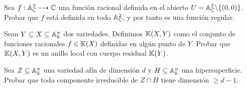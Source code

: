 \documentclass[ACGA.tex]{subfiles}
\begin{document}
\begin{ejer}\label{a2menos0}
 Sea $f:\mathbb{A}^2_{\mathbb{C}}\dashrightarrow\mathbb{C}$ una función racional definida en el abierto $U=\mathbb{A}^2_{\mathbb{C}}\backslash\{(0,0)\}$. Probar que $f$ está definida en todo $\mathbb{A}^2_{\mathbb{C}}$, y por tanto es una función regular.
\end{ejer}

\begin{ejer}
 Sean $Y\subseteq X\subseteq\mathbb{A}^n_k$ dos variedades. Definimos $\mathbb{K}(X,Y)$ como el conjunto de funciones racionales $f\in\mathbb{K}(X)$ definidas en algún punto de $Y$. Probar que $\mathbb{K}(X,Y)$ es un anillo local con cuerpo residual $\mathbb{K}(Y)$.
\end{ejer}

\begin{ejer}\label{dimensionhipersuperficie}
 Sea $Z\subseteq\mathbb{A}^n_k$ una variedad afín de dimensión $d$ y $H\subseteq\mathbb{A}^n_k$ una hipersuperficie. Probar que toda componente irreducible de $Z\cap H$ tiene dimensión $\geq d-1$.
\end{ejer}
\end{document}
